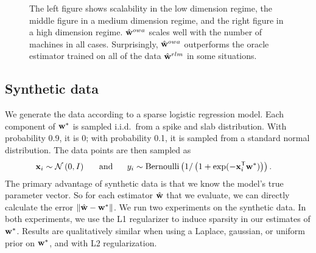 \documentclass[thesis.tex]{subfiles}
\begin{document}
\begin{figure*}[t]
\caption{
    The left figure shows scalability in the low dimension regime,
    the middle figure in a medium dimension regime,
    and the right figure in a high dimension regime.
    $\hat{\mathbf w}^{owa}$ scales well with the number of machines in all cases.
    Surprisingly, $\hat{\mathbf w}^{owa}$ outperforms the oracle estimator trained on all of the data $\hat{\mathbf w}^{rlm}$ in some situations.
    \vspace{-0.1in}
    }
\label{fig:synscale}
\end{figure*}


\vspace{-0.1in}
\subsection{Synthetic data}

\vspace{-0.05in}
We generate the data according to a sparse logistic regression model.
Each component of ${\mathbf w^{*}}$ is sampled i.i.d.\ from a spike and slab distribution.
With probability 0.9, it is 0;
with probability 0.1, it is sampled from a standard normal distribution.
The data points are then sampled as
\begin{equation}
\begin{aligned}
\mathbf{x}_i &\sim \mathcal{N}\left({{0}},{{I}}\right)
    \text{~~~~~and~~~~~}
y_i \sim \text{Bernoulli}\left(1/\left(1+\exp(-{\mathbf{x}}^{\mathsf{T}}_i{\mathbf w^{*}})\right)\right)
.
\end{aligned}
\end{equation}
The primary advantage of synthetic data is that we know the model's true parameter vector.
So for each estimator ${\hat{\mathbf w}}$ that we evaluate, we can directly calculate the error ${\lVert {{\hat{\mathbf w}}-{\mathbf w^{*}}} \rVert}$.
We run two experiments on the synthetic data.
In both experiments, we use the L1 regularizer to induce sparsity in our estimates of ${\mathbf w^{*}}$.
Results are qualitatively similar when using a Laplace, gaussian, or uniform prior on ${\mathbf w^{*}}$, and with L2 regularization.
\end{document}
